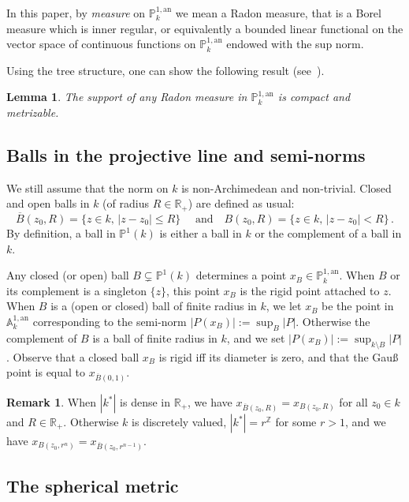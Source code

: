 \documentclass[11pt]{article}
\newtheorem{lemm}[theo]{Lemma}
\theoremstyle{definition}
\newtheorem{rema}[theo]{Remark}
\numberwithin{equation}{section}
\numberwithin{figure}{section}
\numberwithin{table}{section}
\newcommand{\A}{{\mathbb A}}
\newcommand{\R}{{\mathbb R}}
\newcommand{\Z}{{\mathbb Z}}
\newcommand{\an}{\mathrm{an}}
\newcommand{\PP}{\mathbb{P}}
\begin{document}
In this paper, by \emph{measure} on $\PP^{1,\an}_k$ we mean a Radon measure, that is a Borel measure which is inner regular, or equivalently a bounded linear functional on the vector space of continuous functions on $\PP^{1,\an}_k$ endowed with the sup norm.

Using the tree structure, one can show the following result (see~\cite[Lem.~7.15]{valtree}).

\begin{lemm}\label{lem:support}
The support of any Radon measure in $\PP^{1,\an}_k$ is compact and metrizable.
\end{lemm}

\subsection{Balls in the projective line and semi-norms}\label{subsec:balls}

We still assume that the norm on $k$ is non-Archimedean and non-trivial. Closed and open balls in $k$ (of radius $R \in \R_+$) are defined as usual:
\[
\overline{B}(z_0,R)= \{ z\in k, \, | z -z_0| \le R\} \quad\text{ and}\quad {B}(z_0,R)= \{ z\in k, \, | z -z_0| < R\}\,.
\]
By definition, a ball in $\PP^1(k)$ is either a ball in $k$ or the complement of a ball in $k$.

Any closed (or open) ball $B\subsetneq\PP^1(k)$ determines a point $x_B\in \PP^{1,\an}_k$. When $B$ or its complement is a singleton $\{ z\}$, this point $x_B $ is the rigid point attached to $z$. When $B$ is a (open or closed) ball of finite radius in $k$, we let $x_B$ be the point in $\A^{1,\an}_k$ corresponding to the semi-norm $|P(x_B)| := \sup_B |P|$. Otherwise the complement of $B$ is a ball of finite radius in $k$, and we set $|P(x_B)| := \sup_{k\setminus B} |P|$. Observe that a closed ball $x_B$ is rigid iff its diameter is zero, and that the Gau{\ss} point is equal to $x_{\overline{B}(0,1)}$.

\begin{rema}
When $|k^*|$ is dense in $\R_+$, we have $x_{\overline{B}(z_0,R)}=x_{B(z_0,R)}$ for all $z_0\in k$ and $R\in \R_+$. Otherwise $k$ is discretely valued, $|k^*| = r^\Z$ for some $r>1$, and we have $x_{B(z_0,r^n)}= x_{\overline{B}(z_0,r^{n-1})}$.
\end{rema}

\subsection{The spherical metric}
\end{document}
